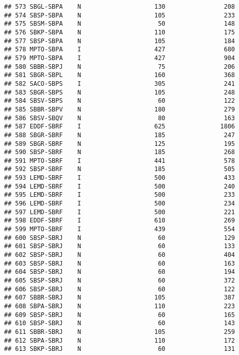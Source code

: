 \documentclass[
]{article}
\begin{document}
\begin{verbatim}
## 573 SBGL-SBPA    N                    130                208
## 574 SBSP-SBPA    N                    105                233
## 575 SBSM-SBPA    N                     50                148
## 576 SBKP-SBPA    N                    110                175
## 577 SBSP-SBPA    N                    105                184
## 578 MPTO-SBPA    I                    427                680
## 579 MPTO-SBPA    I                    427                904
## 580 SBBR-SBPJ    N                     75                206
## 581 SBGR-SBPL    N                    160                368
## 582 SACO-SBPS    I                    305                241
## 583 SBGR-SBPS    N                    105                248
## 584 SBSV-SBPS    N                     60                122
## 585 SBBR-SBPV    N                    180                279
## 586 SBSV-SBQV    N                     80                163
## 587 EDDF-SBRF    I                    625               1806
## 588 SBGR-SBRF    N                    185                247
## 589 SBGR-SBRF    N                    125                195
## 590 SBSP-SBRF    N                    185                268
## 591 MPTO-SBRF    I                    441                578
## 592 SBSP-SBRF    N                    185                505
## 593 LEMD-SBRF    I                    500                433
## 594 LEMD-SBRF    I                    500                240
## 595 LEMD-SBRF    I                    500                233
## 596 LEMD-SBRF    I                    500                234
## 597 LEMD-SBRF    I                    500                221
## 598 EDDF-SBRF    I                    610                269
## 599 MPTO-SBRF    I                    439                554
## 600 SBSP-SBRJ    N                     60                129
## 601 SBSP-SBRJ    N                     60                133
## 602 SBSP-SBRJ    N                     60                404
## 603 SBSP-SBRJ    N                     60                163
## 604 SBSP-SBRJ    N                     60                194
## 605 SBSP-SBRJ    N                     60                372
## 606 SBSP-SBRJ    N                     60                122
## 607 SBBR-SBRJ    N                    105                387
## 608 SBPA-SBRJ    N                    110                223
## 609 SBSP-SBRJ    N                     60                165
## 610 SBSP-SBRJ    N                     60                143
## 611 SBBR-SBRJ    N                    105                259
## 612 SBPA-SBRJ    N                    110                172
## 613 SBKP-SBRJ    N                     60                131

\end{verbatim}
\end{document}
